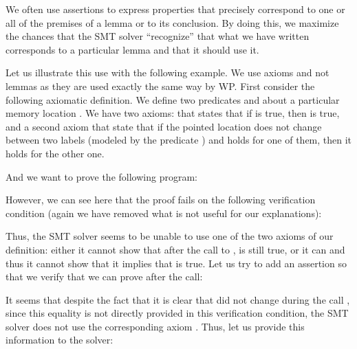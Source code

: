 

We often use assertions to express properties that precisely correspond to one
or all of the premises of a lemma or to its conclusion. By doing this, we
maximize the chances that the SMT solver ``recognize'' that what we have written
corresponds to a particular lemma and that it should use it. 



Let us illustrate this use with the following example. We use axioms and not
lemmas as they are used exactly the same way by WP. First consider the following
axiomatic definition. We define  two predicates  and
 about a particular memory location . We have two
axioms:  that states that if  is true, then
 is true, and a second axiom  that state that
if the pointed location does not change between two labels (modeled by the
predicate ) and  holds for one of them, then it
holds for the other one.





And we want to prove the following program:




However, we can see here that the proof fails on the following verification
condition (again we have removed what is not useful for our explanations):




Thus, the SMT solver seems to be unable to use one of the two axioms of our
definition: either it cannot show that after the call to ,
 is still true, or it can and thus it cannot show that it
implies that  is true. Let us try to add an assertion so that
we verify that we can prove  after the call:








It seems that despite the fact that it is clear that  did not
change during the call , since this equality is not directly
provided in this verification condition, the SMT solver does not use the
corresponding axiom . Thus, let us provide this information to
the solver:


